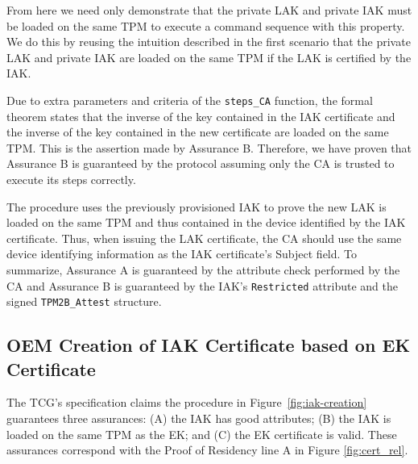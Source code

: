 \documentclass[runningheads]{llncs}
\begin{document}
From here we need only demonstrate that the private LAK and private IAK
must be loaded on the same TPM to execute a command sequence with this property.
We do this by reusing the intuition described in the first scenario that
the private LAK and private IAK are loaded on the same TPM if the LAK
is certified by the IAK.

Due to extra parameters and criteria of the \verb|steps_CA| function,
the formal theorem states that the inverse of the key contained in the
IAK certificate and the inverse of the key contained in the new
certificate are loaded on the same TPM. This is the assertion made by
Assurance B.  Therefore, we have proven that Assurance B is guaranteed
by the protocol assuming only the CA is trusted to execute its steps
correctly.

The procedure uses the previously provisioned IAK to prove the new LAK
is loaded on the same TPM and thus contained in the device identified
by the IAK certificate. Thus, when issuing the LAK certificate, the CA
should use the same device identifying information as the IAK
certificate's Subject field. To summarize, Assurance A is guaranteed
by the attribute check performed by the CA and Assurance B is
guaranteed by the IAK's \verb|Restricted| attribute and the signed
\verb|TPM2B_Attest| structure.

\subsection{OEM Creation of IAK Certificate based on EK Certificate}

The TCG's specification claims the procedure in
Figure~\ref{fig:iak-creation} guarantees three assurances: (A) the IAK
has good attributes; (B) the IAK is loaded on the same TPM as the EK;
and (C) the EK certificate is valid. These assurances correspond with
the Proof of Residency line A in Figure \ref{fig:cert_rel}.
\end{document}
